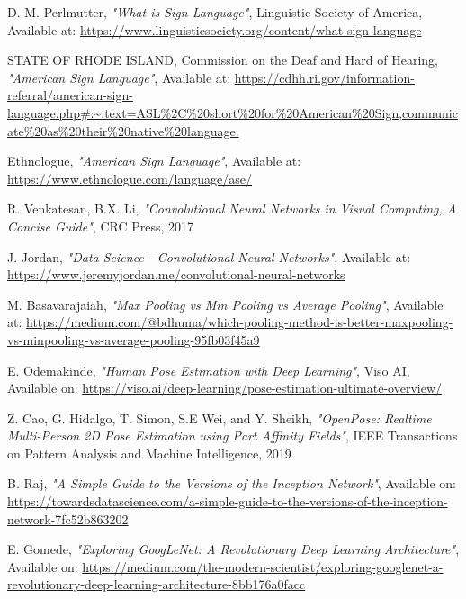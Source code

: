 \documentclass[11pt]{article}
\begin{document}
\pagebreak 

\begin{thebibliography}{30}
     D. M. Perlmutter, \emph{"What is Sign Language"}, Linguistic Society of America, Available at: \url{https://www.linguisticsociety.org/content/what-sign-language}

     STATE OF RHODE ISLAND, Commission on the Deaf and Hard of Hearing, \emph{"American Sign Language"}, Available at: \url{https://cdhh.ri.gov/information-referral/american-sign-language.php#:~:text=ASL%2C%20short%20for%20American%20Sign,communicate%20as%20their%20native%20language.}

     Ethnologue, \emph{"American Sign Language"}, Available at: \url{https://www.ethnologue.com/language/ase/}

     R. Venkatesan, B.X. Li, \emph{"Convolutional Neural Networks in Visual Computing, A Concise Guide"}, CRC Press, 2017

     J. Jordan, \emph{"Data Science - Convolutional Neural Networks"}, Available at: \url{https://www.jeremyjordan.me/convolutional-neural-networks}

     M. Basavarajaiah, \emph{"Max Pooling vs Min Pooling vs Average Pooling"}, Available at: \url{https://medium.com/@bdhuma/which-pooling-method-is-better-maxpooling-vs-minpooling-vs-average-pooling-95fb03f45a9}

     E. Odemakinde, \emph{"Human Pose Estimation with Deep Learning"}, Viso AI, Available on: \url{https://viso.ai/deep-learning/pose-estimation-ultimate-overview/}

     Z. Cao, G. Hidalgo, T. Simon, S.E Wei, and Y. Sheikh, \emph{"OpenPose: Realtime Multi-Person 2D Pose Estimation using Part Affinity Fields"}, IEEE Transactions on Pattern Analysis and Machine Intelligence, 2019

     B. Raj, \emph{"A Simple Guide to the Versions of the Inception Network"}, Available on: \url{https://towardsdatascience.com/a-simple-guide-to-the-versions-of-the-inception-network-7fc52b863202}

     E. Gomede, \emph{"Exploring GoogLeNet: A Revolutionary Deep Learning Architecture"}, Available on: \url{https://medium.com/the-modern-scientist/exploring-googlenet-a-revolutionary-deep-learning-architecture-8bb176a0facc}

\end{thebibliography}
\end{document}
